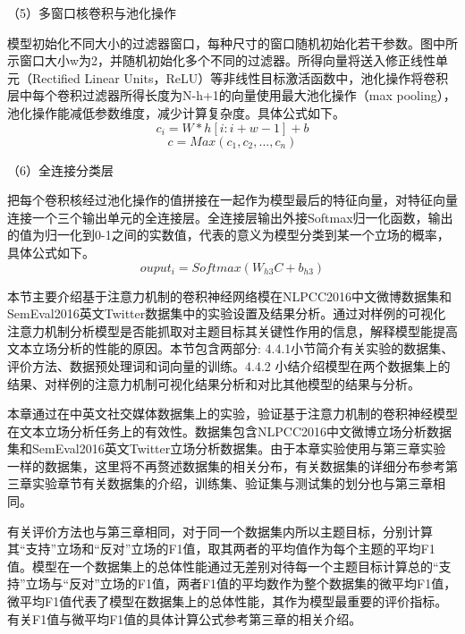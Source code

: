 （5）多窗口核卷积与池化操作

模型初始化不同大小的过滤器窗口，每种尺寸的窗口随机初始化若干参数。图中所示窗口大小w为2，并随机初始化多个不同的过滤器。所得向量将送入修正线性单元（Rectified Linear Units，ReLU）等非线性目标激活函数中，池化操作将卷积层中每个卷积过滤器所得长度为N-h+1的向量使用最大池化操作（max pooling），池化操作能减低参数维度，减少计算复杂度。具体公式如下。
\begin{equation}\label{conv1} c_i=W*h[i:i+w-1]+b \end{equation}
\begin{equation}\label{conv1} c=Max(c_1,c_2,...,c_n) \end{equation}

（6）全连接分类层

把每个卷积核经过池化操作的值拼接在一起作为模型最后的特征向量，对特征向量连接一个三个输出单元的全连接层。全连接层输出外接Softmax归一化函数，输出的值为归一化到0-1之间的实数值，代表的意义为模型分类到某一个立场的概率，具体公式如下。
\begin{equation}\label{conv1} ouput_i=Softmax(W_{h3}C+b_{h3}) \end{equation}




本节主要介绍基于注意力机制的卷积神经网络模在NLPCC2016中文微博数据集和SemEval2016英文Twitter数据集中的实验设置及结果分析。通过对样例的可视化注意力机制分析模型是否能抓取对主题目标其关键性作用的信息，解释模型能提高文本立场分析的性能的原因。本节包含两部分: 4.4.1小节简介有关实验的数据集、评价方法、数据预处理词和词向量的训练。4.4.2 小结介绍模型在两个数据集上的结果、对样例的注意力机制可视化结果分析和对比其他模型的结果与分析。



本章通过在中英文社交媒体数据集上的实验，验证基于注意力机制的卷积神经模型在文本立场分析任务上的有效性。数据集包含NLPCC2016中文微博立场分析数据集和SemEval2016英文Twitter立场分析数据集。由于本章实验使用与第三章实验一样的数据集，这里将不再赘述数据集的相关分布，有关数据集的详细分布参考第三章实验章节有关数据集的介绍，训练集、验证集与测试集的划分也与第三章相同。

有关评价方法也与第三章相同，对于同一个数据集内所以主题目标，分别计算其“支持”立场和“反对”立场的F1值，取其两者的平均值作为每个主题的平均F1值。模型在一个数据集上的总体性能通过无差别对待每一个主题目标计算总的“支持”立场与“反对”立场的F1值，两者F1值的平均数作为整个数据集的微平均F1值，微平均F1值代表了模型在数据集上的总体性能，其作为模型最重要的评价指标。有关F1值与微平均F1值的具体计算公式参考第三章的相关介绍。

